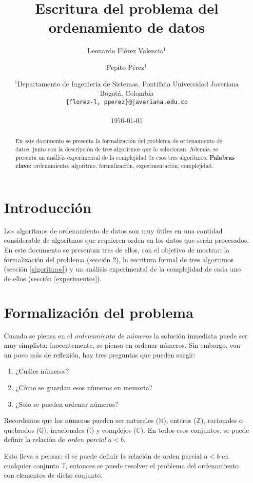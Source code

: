 \documentclass[letter]{article}
\title{Escritura del problema del ordenamiento de datos}
\author{Leonardo Flórez Valencia$^1$ \and Pepito Pérez$^1$}
\date{
	$^1$Departamento de Ingeniería de Sistemas, Pontificia Universidad Javeriana\\Bogotá,  Colombia \\
	\texttt{\{florez-l, pperez\}@javeriana.edu.co}\\~\\
	\today
}
\begin{document}
\maketitle
	
\begin{abstract}
En este documento se presenta la formalización del problema de ordenamiento de datos, junto con la descripción de tres algoritmos que lo solucionan. Además, se presenta un análisis experimental de la complejidad de esos tres algoritmos.
\textbf{Palabras clave:} ordenamiento, algoritmo, formalización, experimentación, complejidad.
\end{abstract}

\tableofcontents
	
\section{Introducción} \label{intro}
Los algoritmos de ordenamiento de datos son muy útiles en una cantidad considerable de algoritmos que requieren orden en los datos que serán procesados. En este documento se presentan tres de ellos, con el objetivo de mostrar: la formalización del problema (sección \ref{formalizacion}), la escritura formal de tres algoritmos (sección \ref{algoritmos}) y un análisis experimental de la complejidad de cada uno de ellos (sección \ref{experimentos}).

\section{Formalización del problema} \label{formalizacion}
Cuando se piensa en el {\it ordenamiento de números} la solución inmediata puede ser muy simplista: inocentemente, se piensa en ordenar números. Sin embargo, con un poco más de reflexión, hay tres preguntas que pueden surgir:
\begin{enumerate}
  \item ¿Cuáles números?
  \item ¿Cómo se guardan esos números en memoria?
  \item ¿Solo se pueden ordenar números?
\end{enumerate}

Recordemos que los números pueden ser naturales ($\mathbb{N}$), enteros ($\mathbb{Z}$), racionales o quebrados ($\mathbb{Q}$), irracionales ($\mathbb{I}$) y complejos ($\mathbb{C}$). En todos esos conjuntos, se puede definir la relación de {\it orden parcial} $a<b$.

Esto lleva a pensar: si se puede definir la relación de orden parcial $a<b$ en cualquier conjunto $\mathbb{T}$, entonces se puede resolver el problema del ordenamiento con elementos de dicho conjunto.
\end{document}
